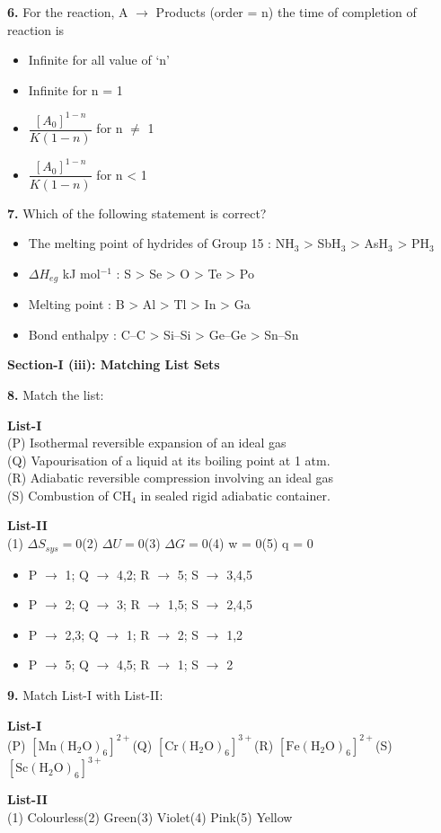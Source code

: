 \documentclass[10pt,twocolumn]{extarticle}
\newenvironment{qoptions}{\begin{itemize}[leftmargin=1.8em,itemsep=2pt,topsep=2pt,label={}]}{\end{itemize}}
\newcommand{\opt}[2]{\item[({#1})] {#2}}
\newcommand{\subsectionhdr}[1]{\par\vspace{3pt}\noindent\textbf{#1}\par\vspace{2pt}}
\begin{document}
\textbf{6.} For the reaction,
A $\to$ Products (order = n)
the time of completion of reaction is

\begin{qoptions}
\opt{A}{Infinite for all value of `n'}
\opt{B}{Infinite for n = 1}
\opt{C}{$\dfrac{[A_0]^{1-n}}{K(1-n)}$ for n $\neq$ 1}
\opt{D}{$\dfrac{[A_0]^{1-n}}{K(1-n)}$ for n < 1}
\end{qoptions}

\textbf{7.} Which of the following statement is correct?

\begin{qoptions}
\opt{A}{The melting point of hydrides of Group 15 : NH$_3$ > SbH$_3$ > AsH$_3$ > PH$_3$}
\opt{B}{$\Delta H_{eg}$ kJ mol$^{-1}$ : S > Se > O > Te > Po}
\opt{C}{Melting point : B > Al > Tl > In > Ga}
\opt{D}{Bond enthalpy : C--C > Si--Si > Ge--Ge > Sn--Sn}
\end{qoptions}

\subsectionhdr{Section-I (iii): Matching List Sets}

\textbf{8.} Match the list:

\textbf{List-I}\\
(P) Isothermal reversible expansion of an ideal gas\\
(Q) Vapourisation of a liquid at its boiling point at 1 atm.\\
(R) Adiabatic reversible compression involving an ideal gas\\
(S) Combustion of CH$_4$ in sealed rigid adiabatic container.

\textbf{List-II}\\
(1) $\Delta S_{sys}=0$\quad (2) $\Delta U=0$\quad (3) $\Delta G=0$\quad (4) w = 0\quad (5) q = 0

\begin{qoptions}
\opt{A}{P $\to$ 1; Q $\to$ 4,2; R $\to$ 5; S $\to$ 3,4,5}
\opt{B}{P $\to$ 2; Q $\to$ 3; R $\to$ 1,5; S $\to$ 2,4,5}
\opt{C}{P $\to$ 2,3; Q $\to$ 1; R $\to$ 2; S $\to$ 1,2}
\opt{D}{P $\to$ 5; Q $\to$ 4,5; R $\to$ 1; S $\to$ 2}
\end{qoptions}

\textbf{9.} Match List-I with List-II:

\textbf{List-I}\\
(P) $[\text{Mn}(\text{H}_2\text{O})_6]^{2+}$\quad (Q) $[\text{Cr}(\text{H}_2\text{O})_6]^{3+}$\quad (R) $[\text{Fe}(\text{H}_2\text{O})_6]^{2+}$\quad (S) $[\text{Sc}(\text{H}_2\text{O})_6]^{3+}$

\textbf{List-II}\\
(1) Colourless\quad (2) Green\quad (3) Violet\quad (4) Pink\quad (5) Yellow
\end{document}

